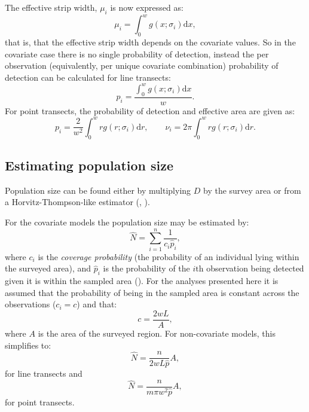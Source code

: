 The effective strip width, $\mu_i$ is now expressed as:
\begin{equation}
\mu_i = \int_0^w g(x ; \sigma_i) \text{d}x,
\label{intro-ds-mu-covar}
\end{equation}
that is, that the effective strip width depends on the covariate values. So in the covariate case there is no single probability of detection, instead the per observation (equivalently, per unique covariate combination) probability of detection can be calculated for line transects:
\begin{equation*}
p_i = \frac{\int_0^w g(x ; \sigma_{i}) \text{d}x}{w}.
\end{equation*}
For point transects, the probability of detection and effective area are given as:
\begin{equation*}
p_i =\frac{2}{w^2}\int_0^w r g(r; \sigma_i) \text{d}r, \qquad \nu_i = 2\pi \int_0^w r g(r; \sigma_i) \text{d}r.
\end{equation*}
\label{cor-7s11}

\subsection{Estimating population size}
\label{intro-ds-pop-size}
\label{cor-r61}

Population size can be found either by multiplying $D$ by the survey area or from a Horvitz-Thompson-like estimator (\cite[pp. 53-56]{thompson}, \cite[p. 23]{ADS}).

For the covariate models the population size may be estimated by:
\begin{equation}
\hat{N} = \sum_{i=1}^n \frac{1}{c_i \hat{p}_i},
\label{HT-ds-est}
\end{equation}
where $c_i$ is the \textit{coverage probability} (the probability of an individual lying within the surveyed area), and $\hat{p}_i$ is the probability of the $i\text{th}$ observation being detected given it is within the sampled area (\cite[p. 7 and 38]{ADS}). For the analyses presented here it is assumed that the probability of being in the sampled area is constant across the observations ($c_i=c$) and that:
\begin{equation*}
c=\frac{2wL}{A},
\end{equation*}
where $A$ is the area of the surveyed region. For non-covariate models, this simplifies to:
\begin{equation*}
\hat{N} =  \frac{n}{2 w L \hat{p}}A,
\end{equation*}
for line transects and
\begin{equation*}
\hat{N} =  \frac{n}{m \pi w^2 \hat{p}}A,
\end{equation*}
for point transects.

